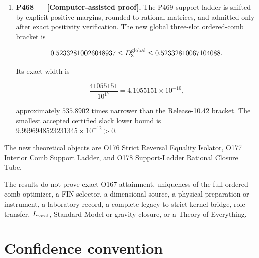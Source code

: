 \documentclass[11pt,a4paper,openany]{report}
\begin{document}
\begin{enumerate}
The normalizer is safely interior, with minimum eigenvalue \(0.057723558496969855\), and the transformed process difference is nonsingular, with minimum absolute eigenvalue \(0.008009754936339366\). The numerical result is compelling but does not prove an exact nonlinear root.

\item 
\textbf{P468 --- \textcolor{fingreen}{[Computer-assisted proof]}.} The P469 support ladder is shifted by explicit positive margins, rounded to rational matrices, and admitted only after exact positivity verification. The new global three-slot ordered-comb bracket is

\[
   0.52332810026048937
   \le D_3^{\rm global}\le
   0.52332810067104088.
   \]

Its exact width is

\[
   \frac{41055151}{10^{17}}
   =4.1055151\times10^{-10},
   \]

approximately \(535.8902\) times narrower than the Release-10.42 bracket. The smallest accepted certified slack lower bound is \(9.9996948523231345\times10^{-12}>0\).

\end{enumerate}

The new theoretical objects are O176 Strict Reversal Equality Isolator, O177 Interior Comb Support Ladder, and O178 Support-Ladder Rational Closure Tube.

The results do not prove exact O167 attainment, uniqueness of the full ordered-comb optimizer, a FIN selector, a dimensional source, a physical preparation or instrument, a laboratory record, a complete legacy-to-strict kernel bridge, role transfer, \(L_{\rm total}\), Standard Model or gravity closure, or a Theory of Everything.

\chapter{Confidence convention}
\end{document}
